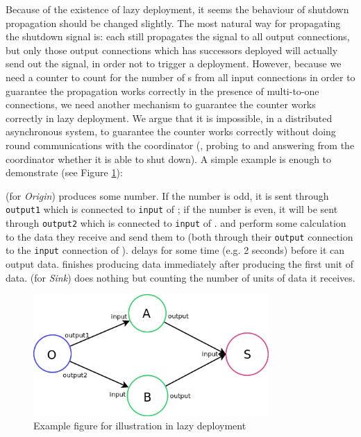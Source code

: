 Because of the existence of lazy deployment, it seems the behaviour of shutdown propagation should be changed slightly. The most natural way for propagating the shutdown signal is: each \tPEInst still propagates the \dEOS signal to all output connections, but only those output connections which has successors deployed will actually send out the \dEOS signal, in order not to trigger a deployment. However, because we need a counter to count for the number of \dEOS{}s from all input connections in order to guarantee the propagation works correctly in the presence of multi-to-one connections, we need another mechanism to guarantee the counter works correctly in lazy deployment. We argue that it is impossible, in a distributed asynchronous system, to guarantee the counter works correctly without doing round communications with the coordinator (\eg, probing to and answering from the coordinator whether it is able to shut down). A simple example is enough to demonstrate (see Figure \ref{fig:incdep_lazydep_0}):


\ndO (for \emph{Origin}) produces some number. If the number is odd, it is sent through \lstinline|output1| which is connected to \lstinline|input| of \ndA; if the number is even, it will be sent through \lstinline|output2| which is connected to \lstinline|input| of \ndB. \ndA and \ndB perform some calculation to the data they receive and send them to \ndS (both through their \lstinline|output| connection to the \lstinline|input| connection of \ndS). \ndB delays for some time (e.g. 2 seconds) before it can output data. \ndA finishes producing data immediately after producing the first unit of data. \ndS (for \emph{Sink}) does nothing but counting the number of units of data it receives.

\begin{figure}[h]
\centering
    \includegraphics[width=0.8\textwidth]{figures/incdep_lazydep_0}
	\caption{Example figure for illustration in lazy deployment}
	\label{fig:incdep_lazydep_0}
\end{figure}

